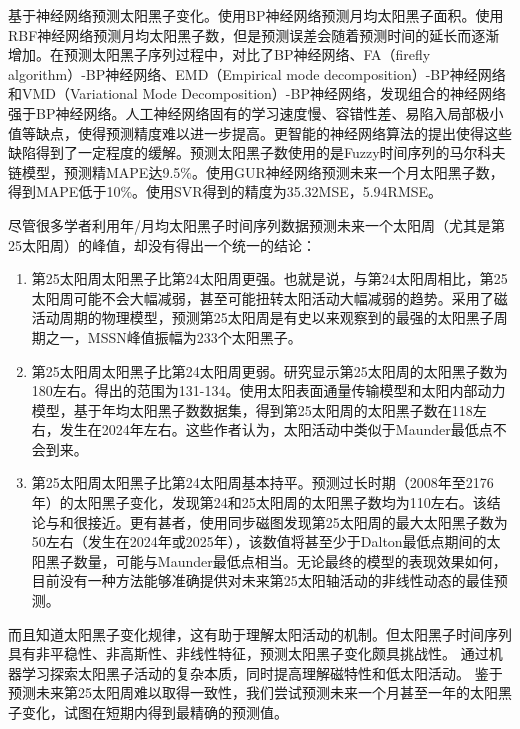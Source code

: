 \citet{ren2014neural}基于神经网络预测太阳黑子变化。\citet{ding2012prediction}使用BP神经网络预测月均太阳黑子面积。\citet{zhao2008prediction}使用RBF神经网络预测月均太阳黑子数，但是预测误差会随着预测时间的延长而逐渐增加。\citet{li2018hybrid}在预测太阳黑子序列过程中，对比了BP神经网络、FA（firefly algorithm）-BP神经网络、EMD（Empirical mode decomposition）-BP神经网络和VMD（Variational Mode Decomposition）-BP神经网络，发现组合的神经网络强于BP神经网络。人工神经网络固有的学习速度慢、容错性差、易陷入局部极小值等缺点，使得预测精度难以进一步提高。更智能的神经网络算法的提出使得这些缺陷得到了一定程度的缓解。\citet{novitasari2019flare}预测太阳黑子数使用的是Fuzzy时间序列的马尔科夫链模型，预测精MAPE达9.5\%。\citet{arfianti15sunspot}使用GUR神经网络预测未来一个月太阳黑子数，得到MAPE低于10\%。\citet{suwanto2019prediksi}使用SVR得到的精度为35.32MSE，5.94RMSE。


尽管很多学者利用年/月均太阳黑子时间序列数据预测未来一个太阳周（尤其是第25太阳周）的峰值，却没有得出一个统一的结论：
\begin{enumerate}
    \item 第25太阳周太阳黑子比第24太阳周更强。也就是说，与第24太阳周相比，第25太阳周可能不会大幅减弱，甚至可能扭转太阳活动大幅减弱的趋势。\citet{mcintosh2020overlapping}采用了磁活动周期的物理模型，预测第25太阳周是有史以来观察到的最强的太阳黑子周期之一，MSSN峰值振幅为233个太阳黑子。
    \item 第25太阳周太阳黑子比第24太阳周更弱。\citet{pesnell2018effects}研究显示第25太阳周的太阳黑子数为180左右。\citet{bisoi2020another}得出的范围为131-134。\citet{bhowmik2018prediction}使用太阳表面通量传输模型和太阳内部动力模型，基于年均太阳黑子数数据集，得到第25太阳周的太阳黑子数在118左右，发生在2024年左右。这些作者认为，太阳活动中类似于Maunder最低点不会到来。
    \item 第25太阳周太阳黑子比第24太阳周基本持平。\citet{hiremath2008prediction}预测过长时期（2008年至2176年）的太阳黑子变化，发现第24和25太阳周的太阳黑子数均为110左右。该结论与\citet{podladchikova2017sunspot}和\citet{singh2019prediction}很接近。更有甚者，\citep{kitiashvili2020application}使用同步磁图发现第25太阳周的最大太阳黑子数为50左右（发生在2024年或2025年），该数值将甚至少于Dalton最低点期间的太阳黑子数量，可能与Maunder最低点相当。无论最终的模型的表现效果如何，目前没有一种方法能够准确提供对未来第25太阳轴活动的非线性动态的最佳预测。
\end{enumerate}
而且知道太阳黑子变化规律，这有助于理解太阳活动的机制。但太阳黑子时间序列具有非平稳性、非高斯性、非线性特征，预测太阳黑子变化颇具挑战性。
通过机器学习探索太阳黑子活动的复杂本质，同时提高理解磁特性和低太阳活动。
鉴于预测未来第25太阳周难以取得一致性，我们尝试预测未来一个月甚至一年的太阳黑子变化，试图在短期内得到最精确的预测值。

